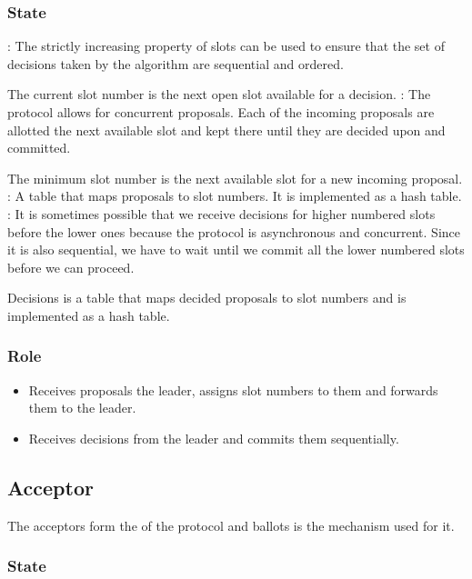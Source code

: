 \subsubsection{State}

\begin{itemize}
    : The strictly increasing property of slots
    can be used to ensure that the set of decisions taken by
    the algorithm are sequential and ordered.

    The current slot number is the next open slot available for a decision.
    : The protocol allows for concurrent proposals.
    Each of the incoming proposals are allotted the next available slot and
    kept there until they are decided upon and committed.

    The minimum slot number is the next available slot for a new incoming
    proposal.
    : A table that maps proposals to slot numbers. It is
    implemented as a hash table.
    : It is sometimes possible that we receive decisions for
    higher numbered slots before the lower ones because the protocol is
    asynchronous and concurrent. Since it is also sequential, we have to wait
    until we commit all the lower numbered slots before we can proceed.

    Decisions is a table that maps decided proposals to slot numbers and is
    implemented as a hash table.
\end{itemize}

\subsubsection{Role}

\begin{itemize}
  \item Receives proposals the leader, assigns slot numbers to them and
    forwards them to the leader.
  \item Receives decisions from the leader and commits them sequentially.
\end{itemize}

\subsection{Acceptor}

The acceptors form the  of the protocol and ballots is the
mechanism used for it.

\subsubsection{State}

